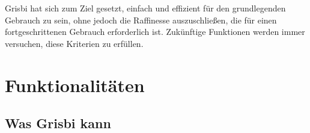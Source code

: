 Grisbi hat sich zum Ziel gesetzt, einfach und effizient für den grundlegenden Gebrauch zu sein, ohne jedoch die Raffinesse auszuschließen, die für einen fortgeschrittenen Gebrauch erforderlich ist. Zukünftige Funktionen werden immer versuchen, diese Kriterien zu erfüllen.


\section{Funktionalitäten\label{introduction-features}}


\subsection{Was Grisbi kann}%

